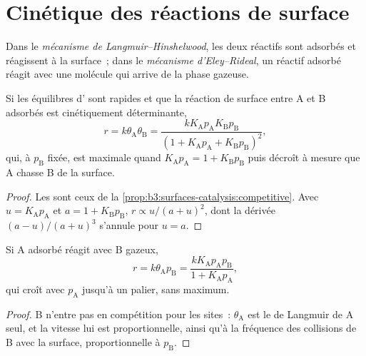 \section{Cinétique des réactions de surface}

\begin{definition}\label{def:b3:surfaces-catalysis:mechanisms}
Dans le \emph{mécanisme de Langmuir--Hinshelwood},
les deux réactifs sont adsorbés et réagissent à la surface~; dans le
\emph{mécanisme d'Eley--Rideal}, un réactif
adsorbé réagit avec une molécule qui arrive de la phase gazeuse.
\end{definition}

\begin{proposition}\label{prop:b3:surfaces-catalysis:lh-rate}
Si les équilibres d' sont rapides et que la réaction de surface
entre A et B adsorbés est cinétiquement déterminante,
\[
  r = k\theta_{\mathrm A}\theta_{\mathrm B} = \frac{kK_{\mathrm A}p_{\mathrm A}K_{\mathrm B}p_{\mathrm B}}{(1 + K_{\mathrm A}p_{\mathrm A} + K_{\mathrm B}p_{\mathrm B})^2},
\]
qui, à $p_{\mathrm B}$ fixée, est maximale quand $K_{\mathrm A}p_{\mathrm A} = 1 + K_{\mathrm B}p_{\mathrm B}$
puis décroît à mesure que A chasse B de la surface.
\end{proposition}

\begin{proof}
Les  sont ceux de la
\cref{prop:b3:surfaces-catalysis:competitive}. Avec $u =
K_{\mathrm A}p_{\mathrm A}$ et $a = 1 + K_{\mathrm B}p_{\mathrm B}$, $r \propto u/(a + u)^2$,
dont la dérivée $(a - u)/(a + u)^3$ s'annule pour
$u = a$.
\end{proof}

\begin{proposition}\label{prop:b3:surfaces-catalysis:er-rate}
Si A adsorbé réagit avec B gazeux,
\[
  r = k\theta_{\mathrm A}p_{\mathrm B} = \frac{kK_{\mathrm A}p_{\mathrm A}p_{\mathrm B}}{1 + K_{\mathrm A}p_{\mathrm A}},
\]
qui croît avec $p_{\mathrm A}$ jusqu'à un palier, sans maximum.
\end{proposition}

\begin{proof}
B n'entre pas en compétition pour les sites~: $\theta_{\mathrm A}$ est le
 de Langmuir de A seul, et la vitesse lui est
proportionnelle, ainsi qu'à la fréquence des collisions de B avec la
surface, proportionnelle à $p_{\mathrm B}$.
\end{proof}

